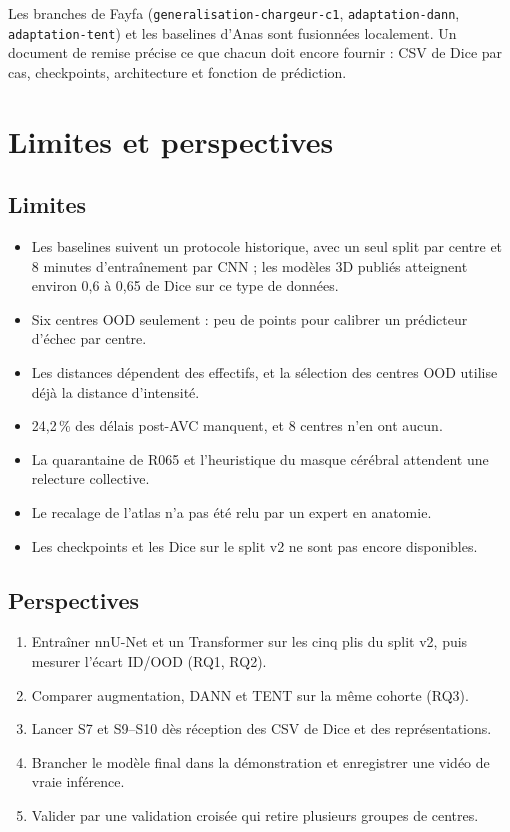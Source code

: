 \documentclass[11pt,a4paper]{report}
\newcommand{\fichier}[1]{\texttt{#1}}
\begin{document}
Les branches de Fayfa (\fichier{generalisation-chargeur-c1},
\fichier{adaptation-dann}, \fichier{adaptation-tent}) et les baselines d'Anas
sont fusionnées localement. Un document de remise précise ce que chacun doit
encore fournir : CSV de Dice par cas, checkpoints, architecture et fonction
de prédiction.

\chapter{Limites et perspectives}

\section{Limites}

\begin{itemize}
  \item Les baselines suivent un protocole historique, avec un seul split par
        centre et 8 minutes d'entraînement par CNN ; les modèles 3D publiés
        atteignent environ 0,6 à 0,65 de Dice sur ce type de données.
  \item Six centres OOD seulement : peu de points pour calibrer un
        prédicteur d'échec par centre.
  \item Les distances dépendent des effectifs, et la sélection des centres
        OOD utilise déjà la distance d'intensité.
  \item 24,2\,\% des délais post-AVC manquent, et 8 centres n'en ont aucun.
  \item La quarantaine de R065 et l'heuristique du masque cérébral attendent
        une relecture collective.
  \item Le recalage de l'atlas n'a pas été relu par un expert en anatomie.
  \item Les checkpoints et les Dice sur le split v2 ne sont pas encore
        disponibles.
\end{itemize}

\section{Perspectives}

\begin{enumerate}
  \item Entraîner nnU-Net et un Transformer sur les cinq plis du split v2,
        puis mesurer l'écart ID/OOD (RQ1, RQ2).
  \item Comparer augmentation, DANN et TENT sur la même cohorte (RQ3).
  \item Lancer S7 et S9--S10 dès réception des CSV de Dice et des
        représentations.
  \item Brancher le modèle final dans la démonstration et enregistrer une
        vidéo de vraie inférence.
  \item Valider par une validation croisée qui retire plusieurs groupes de
        centres.
\end{enumerate}
\end{document}
